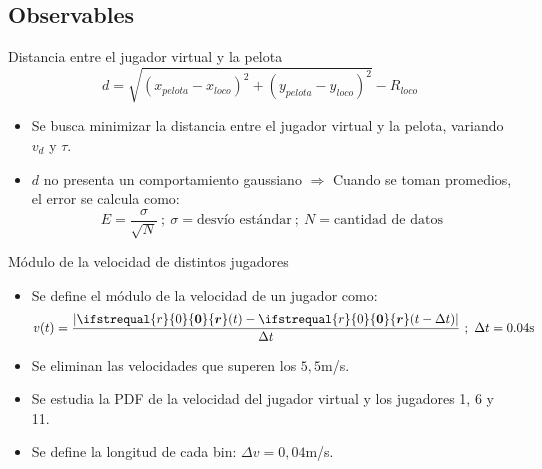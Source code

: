 \documentclass{beamer}
\renewcommand\vec[1]{\ifstrequal{#1}{0}{\ensuremath{\mathbf{0}}}{\ensuremath{\boldsymbol{#1}}}}
\begin{document}
        \subsection{Observables}

            \begin{frame}{Distancia entre el jugador virtual y la pelota}
                \begin{equation*}
                    d = \sqrt{(x_{pelota} - x_{loco})^2 + (y_{pelota} - y_{loco})^2} - R_{loco}
                \end{equation*}
                \begin{itemize}
                    \item Se busca minimizar la distancia entre el jugador virtual y la pelota, variando $v_d$ y $\tau$.
                    \item $d$ no presenta un comportamiento gaussiano $\Rightarrow$ Cuando se toman promedios, el error se calcula como:
                    \begin{equation*}
                        E = \frac{\sigma}{\sqrt{N}}\ ;\ \sigma = \text{desvío estándar}\ ;\ N = \text{cantidad de datos}
                    \end{equation*}
                \end{itemize}
            \end{frame}

            \begin{frame}{Módulo de la velocidad de distintos jugadores}
                \begin{itemize}
                    \item Se define el módulo de la velocidad de un jugador como:
                    \begin{equation*}
                        v(t) = \frac{|\vec{r}(t) - \vec{r}(t - \Delta t)|}{\Delta t}\ ;\ \Delta t = 0.04 \text{s}
                    \end{equation*}
                    \item Se eliminan las velocidades que superen los $5,5$m/s.
                    \item Se estudia la PDF de la velocidad del jugador virtual y los jugadores 1, 6 y 11.
                    \item Se define la longitud de cada bin: $\Delta v = 0,04$m/s.
                \end{itemize}
            \end{frame}
\end{document}

